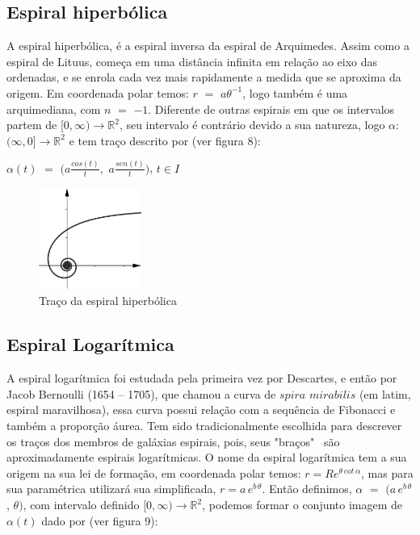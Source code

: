 \documentclass[twoside,a4paper,10pt]{article}
\newcommand{\R}{\mathbb R} %
\begin{document}
\subsection{Espiral hiperbólica}

A espiral hiperbólica, é a espiral inversa da espiral de Arquimedes. Assim como a espiral de Lituus, começa em uma distância infinita em relação ao eixo das ordenadas, e se enrola cada vez mais rapidamente a medida que se aproxima da origem. Em coordenada polar temos: $r$ $=$ $a\theta^{-1}$, logo também é uma arquimediana, com $n$ $=$ $-1$. Diferente de outras espirais em que os intervalos partem de $[0, \infty) \rightarrow \R^2$, seu intervalo é contrário devido a sua natureza, logo $\alpha:$ $(\infty, 0] \rightarrow \R^2$ e tem traço descrito por (ver figura 8):

\begin{center}
	$\alpha(t)$ $=$ $(a\frac{cos(t)}{t},$ $a\frac{sen(t)}{t})$, $t\in I$
\end{center}

\begin{figure}[h!]
	\centering
	\includegraphics[width=0.3\textwidth]{hiper}
	\caption{Traço da espiral hiperbólica}
\end{figure}

\subsection{Espiral Logarítmica}

A espiral logarítmica foi estudada pela primeira vez por Descartes, e então por Jacob Bernoulli (1654 – 1705), que chamou a curva de $spira$ $mirabilis$ (em latim, espiral maravilhosa), essa curva possui relação com a sequência de Fibonacci e também a proporção áurea. Tem sido tradicionalmente escolhida para descrever os traços dos membros de galáxias espirais, pois, seus "braços" \, são aproximadamente espirais logarítmicas. O nome da espiral logarítmica tem a sua origem na sua lei de formação, em coordenada polar temos: $r = Re^{\theta\,cot\,\alpha}$, mas para sua paramétrica utilizará sua simplificada, $r = a\,e^{b\,\theta}$. Então definimos, $\alpha$ $=$ $( a\,e^{b\,\theta}$, $\theta)$, com intervalo definido $[0, \infty) \rightarrow \R^2$, podemos formar o conjunto imagem de $\alpha(t)$ dado por (ver figura 9):\\
\end{document}
